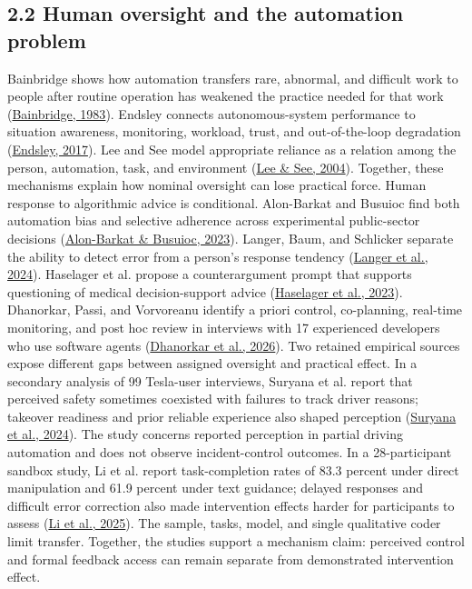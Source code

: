 \documentclass[11pt]{article}
\begin{document}
\subsection*{2.2 Human oversight and the automation problem}
Bainbridge shows how automation transfers rare, abnormal, and difficult work to people after routine operation has weakened the practice needed for that work (\href{https://doi.org/10.1016/0005-1098(83)90046-8}{Bainbridge, 1983}). Endsley connects autonomous-system performance to situation awareness, monitoring, workload, trust, and out-of-the-loop degradation (\href{https://doi.org/10.1177/0018720816681350}{Endsley, 2017}). Lee and See model appropriate reliance as a relation among the person, automation, task, and environment (\href{https://doi.org/10.1518/hfes.46.1.50_30392}{Lee \& See, 2004}). Together, these mechanisms explain how nominal oversight can lose practical force.
Human response to algorithmic advice is conditional. Alon-Barkat and Busuioc find both automation bias and selective adherence across experimental public-sector decisions (\href{https://doi.org/10.1093/jopart/muac007}{Alon-Barkat \& Busuioc, 2023}). Langer, Baum, and Schlicker separate the ability to detect error from a person's response tendency (\href{https://doi.org/10.1007/s11023-024-09701-0}{Langer et al., 2024}). Haselager et al. propose a counterargument prompt that supports questioning of medical decision-support advice (\href{https://doi.org/10.1017/S0963180122000718}{Haselager et al., 2023}). Dhanorkar, Passi, and Vorvoreanu identify a priori control, co-planning, real-time monitoring, and post hoc review in interviews with 17 experienced developers who use software agents (\href{https://doi.org/10.1145/3805689.3812402}{Dhanorkar et al., 2026}).
Two retained empirical sources expose different gaps between assigned oversight and practical effect. In a secondary analysis of 99 Tesla-user interviews, Suryana et al. report that perceived safety sometimes coexisted with failures to track driver reasons; takeover readiness and prior reliable experience also shaped perception (\href{https://doi.org/10.48550/arXiv.2402.08080}{Suryana et al., 2024}). The study concerns reported perception in partial driving automation and does not observe incident-control outcomes. In a 28-participant sandbox study, Li et al. report task-completion rates of 83.3 percent under direct manipulation and 61.9 percent under text guidance; delayed responses and difficult error correction also made intervention effects harder for participants to assess (\href{https://doi.org/10.1109/CAI64502.2025.00121}{Li et al., 2025}). The sample, tasks, model, and single qualitative coder limit transfer. Together, the studies support a mechanism claim: perceived control and formal feedback access can remain separate from demonstrated intervention effect.
\end{document}
